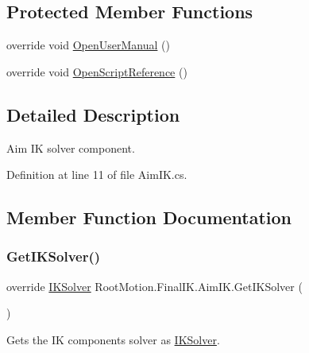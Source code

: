 \subsection*{Protected Member Functions}
\begin{DoxyCompactItemize}
\item 
override void \mbox{\hyperlink{class_root_motion_1_1_final_i_k_1_1_aim_i_k_afdd0f041a17867eb9ea3bdfcabf273c7}{Open\+User\+Manual}} ()
\item 
override void \mbox{\hyperlink{class_root_motion_1_1_final_i_k_1_1_aim_i_k_a0e574684809fdcb9dcd2a972ecc94871}{Open\+Script\+Reference}} ()
\end{DoxyCompactItemize}


\subsection{Detailed Description}
Aim IK solver component. 



Definition at line 11 of file Aim\+I\+K.\+cs.



\subsection{Member Function Documentation}
\mbox{\label{class_root_motion_1_1_final_i_k_1_1_aim_i_k_a32e4e1392cf1b39a33e5bb2c8022f941}} 
\subsubsection{\texorpdfstring{Get\+I\+K\+Solver()}{GetIKSolver()}}
{\footnotesize\ttfamily override \mbox{\hyperlink{class_root_motion_1_1_final_i_k_1_1_i_k_solver}{I\+K\+Solver}} Root\+Motion.\+Final\+I\+K.\+Aim\+I\+K.\+Get\+I\+K\+Solver (\begin{DoxyParamCaption}{ }\end{DoxyParamCaption})\hspace{0.3cm}{\ttfamily [virtual]}}



Gets the IK component\textquotesingle{}s solver as \mbox{\hyperlink{class_root_motion_1_1_final_i_k_1_1_i_k_solver}{I\+K\+Solver}}. 



